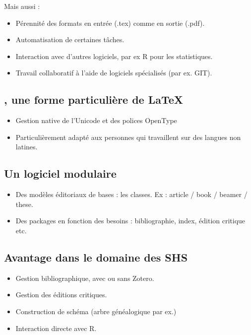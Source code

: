 \begin{slide}
  Mais aussi :
  \begin{itemize}
      \item Pérennité des formats en entrée (.tex) comme en sortie (.pdf).
      \item Automatisation de certaines tâches.
      \item Interaction avec d'autres logiciels, par ex R pour les statistiques.
      \item Travail collaboratif à l'aide de logiciels spécialisés (par ex. GIT).
  \end{itemize}
\end{slide}

\subsection{\XeLaTeX, une forme particulière de \LaTeX}
\begin{slide}
  \begin{itemize}
    \item Gestion native de l'Unicode et des polices OpenType
    \item Particulièrement adapté aux personnes qui travaillent sur des langues non latines.
  \end{itemize}
\end{slide}

\subsection{Un logiciel modulaire}

\begin{slide}
  \begin{itemize}
    \item Des modèles éditoriaux de bases : les classes. Ex : article / book / beamer / these.
    \item Des packages en fonction des besoins : bibliographie, index, édition critique etc. 
  \end{itemize}
\end{slide}
\subsection{Avantage dans le domaine des SHS}

\begin{slide}
  \begin{itemize}
    \item Gestion bibliographique, avec ou sans  Zotero. 
    \item Gestion des éditions critiques.
    \item Construction de schéma (arbre généalogique par ex.)
    \item Interaction directe avec R.
  \end{itemize}
\end{slide}

